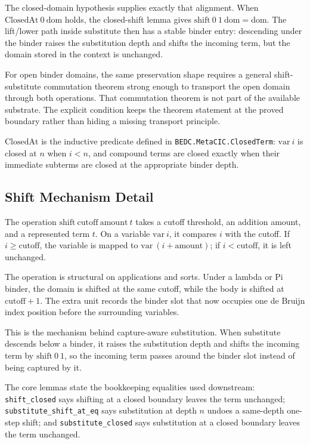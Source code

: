 The closed-domain hypothesis supplies exactly that alignment. When
$\mathrm{ClosedAt}\ 0\ \mathrm{dom}$ holds, the closed-shift lemma gives
$\mathrm{shift}\ 0\ 1\ \mathrm{dom} = \mathrm{dom}$. The lift/lower path
inside $\mathrm{substitute}$ then has a stable binder entry: descending under
the binder raises the substitution depth and shifts the incoming term, but the
domain stored in the context is unchanged.

For open binder domains, the same preservation shape requires a general
shift-substitute commutation theorem strong enough to transport the open
domain through both operations. That commutation theorem is not part of the
available substrate. The explicit condition keeps the theorem statement at the
proved boundary rather than hiding a missing transport principle.

$\mathrm{ClosedAt}$ is the inductive predicate defined in
\texttt{BEDC.MetaCIC.ClosedTerm}: $\mathrm{var}\ i$ is closed at $n$ when
$i<n$, and compound terms are closed exactly when their immediate subterms
are closed at the appropriate binder depth.

\subsection{Shift Mechanism Detail}\label{subsec:reconstruction-shift-detail}

The operation $\mathrm{shift}\ \mathrm{cutoff}\ \mathrm{amount}\ t$ takes a
cutoff threshold, an addition amount, and a represented term $t$. On a
variable $\mathrm{var}\ i$, it compares $i$ with the cutoff. If
$i \geq \mathrm{cutoff}$, the variable is mapped to
$\mathrm{var}\ (i+\mathrm{amount})$; if $i < \mathrm{cutoff}$, it is left
unchanged.

The operation is structural on applications and sorts. Under a lambda or Pi
binder, the domain is shifted at the same cutoff, while the body is shifted at
$\mathrm{cutoff}+1$. The extra unit records the binder slot that now occupies
one de Bruijn index position before the surrounding variables.

This is the mechanism behind capture-aware substitution. When
$\mathrm{substitute}$ descends below a binder, it raises the substitution
depth and shifts the incoming term by $\mathrm{shift}\ 0\ 1$, so the incoming
term passes around the binder slot instead of being captured by it.

The core lemmas state the bookkeeping equalities used downstream:
\texttt{shift\_closed} says shifting at a closed boundary leaves the term
unchanged; \texttt{substitute\_shift\_at\_eq} says substitution at depth $n$
undoes a same-depth one-step shift; and \texttt{substitute\_closed} says
substitution at a closed boundary leaves the term unchanged.

